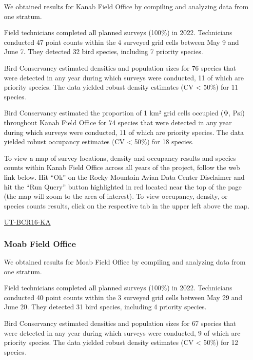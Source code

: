 \documentclass[
  letterpaper,
  DIV=11,
  numbers=noendperiod,
  oneside]{scrreprt}
\begin{document}
We obtained results for Kanab Field Office by compiling and analyzing
data from one stratum.

Field technicians completed all planned surveys (100\%) in 2022.
Technicians conducted 47 point counts within the 4 surveyed grid cells
between May 9 and June 7. They detected 32 bird species, including 7
priority species.

Bird Conservancy estimated densities and population sizes for 76 species
that were detected in any year during which surveys were conducted, 11
of which are priority species. The data yielded robust density estimates
(CV \textless{} 50\%) for 11 species.

Bird Conservancy estimated the proportion of 1 km² grid cells occupied
(Ψ, Psi) throughout Kanab Field Office for 74 species that were detected
in any year during which surveys were conducted, 11 of which are
priority species. The data yielded robust occupancy estimates (CV
\textless{} 50\%) for 18 species.

To view a map of survey locations, density and occupancy results and
species counts within Kanab Field Office across all years of the
project, follow the web link below. Hit ``Ok'' on the Rocky Mountain
Avian Data Center Disclaimer and hit the ``Run Query'' button
highlighted in red located near the top of the page (the map will zoom
to the area of interest). To view occupancy, density, or species counts
results, click on the respective tab in the upper left above the map.

\href{http://www.rmbo.org/new_site/adc/QueryWindow.aspx\#N4IgzgLgTghhCuBbEAuABCAqgFQLQCEBhAJQEYA2XAaQEF194oBTGeNAewDM0AZGAOwAmaALICYAcyaIm/CGlxoq4gEZoAYgEsmAG2EB5Tp00BjJiAC+QA==}{UT-BCR16-KA}

\hypertarget{moab-field-office}{%
\subsubsection{Moab Field Office}\label{moab-field-office}}

We obtained results for Moab Field Office by compiling and analyzing
data from one stratum.

Field technicians completed all planned surveys (100\%) in 2022.
Technicians conducted 40 point counts within the 3 surveyed grid cells
between May 29 and June 20. They detected 31 bird species, including 4
priority species.

Bird Conservancy estimated densities and population sizes for 67 species
that were detected in any year during which surveys were conducted, 9 of
which are priority species. The data yielded robust density estimates
(CV \textless{} 50\%) for 12 species.
\end{document}
